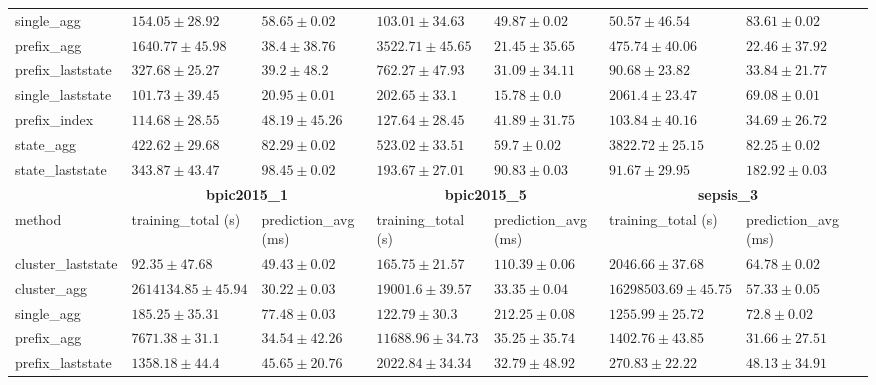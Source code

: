 \begin{table}[!htbp]
{\begin{tabular}{llllllll}
			single\_agg & $154.05 \pm 28.92$ & $58.65 \pm 0.02$ & $103.01 \pm 34.63$ & $49.87 \pm 0.02$ & $\mathbf{50.57 \pm 46.54}$ & $83.61 \pm 0.02$ \\ 
			prefix\_agg & $1640.77 \pm 45.98$ & $38.4 \pm 38.76$ & $3522.71 \pm 45.65$ & $21.45 \pm 35.65$ & $475.74 \pm 40.06$ & $\mathbf{22.46 \pm 37.92}$ \\ 
			prefix\_laststate & $327.68 \pm 25.27$ & $39.2 \pm 48.2$ & $762.27 \pm 47.93$ & $31.09 \pm 34.11$ & $90.68 \pm 23.82$ & $33.84 \pm 21.77$ \\ 
			single\_laststate & $101.73 \pm 39.45$ & $\mathbf{20.95 \pm 0.01}$ & $202.65 \pm 33.1$ & $\mathbf{15.78 \pm 0.0}$ & $2061.4 \pm 23.47$ & $69.08 \pm 0.01$ \\ 
			prefix\_index & $114.68 \pm 28.55$ & $48.19 \pm 45.26$ & $127.64 \pm 28.45$ & $41.89 \pm 31.75$ & $103.84 \pm 40.16$ & $34.69 \pm 26.72$ \\ 
			state\_agg & $422.62 \pm 29.68$ & $82.29 \pm 0.02$ & $523.02 \pm 33.51$ & $59.7 \pm 0.02$ & $3822.72 \pm 25.15$ & $82.25 \pm 0.02$ \\ 
			state\_laststate & $343.87 \pm 43.47$ & $98.45 \pm 0.02$ & $193.67 \pm 27.01$ & $90.83 \pm 0.03$ & $91.67 \pm 29.95$ & $182.92 \pm 0.03$ \\ 
			\bottomrule
			\toprule
			& \multicolumn{2}{c}{{\bfseries bpic2015\_1}} & \multicolumn{2}{c}{{\bfseries bpic2015\_5}} & \multicolumn{2}{c}{{\bfseries sepsis\_3}} \\ \cmidrule(lr){2-3} \cmidrule(lr){4-5} \cmidrule(lr){6-7}
			method  & training\_total (s) & prediction\_avg (ms) & training\_total (s) & prediction\_avg (ms) & training\_total (s) & prediction\_avg (ms) \\ \midrule
			cluster\_laststate & $92.35 \pm 47.68$ & $49.43 \pm 0.02$ & $165.75 \pm 21.57$ & $110.39 \pm 0.06$ & $2046.66 \pm 37.68$ & $64.78 \pm 0.02$ \\ 
			cluster\_agg & $2614134.85 \pm 45.94$ & $30.22 \pm 0.03$ & $19001.6 \pm 39.57$ & $33.35 \pm 0.04$ & $16298503.69 \pm 45.75$ & $57.33 \pm 0.05$ \\ 
			single\_agg & $185.25 \pm 35.31$ & $77.48 \pm 0.03$ & $122.79 \pm 30.3$ & $212.25 \pm 0.08$ & $1255.99 \pm 25.72$ & $72.8 \pm 0.02$ \\ 
			prefix\_agg & $7671.38 \pm 31.1$ & $34.54 \pm 42.26$ & $11688.96 \pm 34.73$ & $35.25 \pm 35.74$ & $1402.76 \pm 43.85$ & $\mathbf{31.66 \pm 27.51}$ \\ 
			prefix\_laststate & $1358.18 \pm 44.4$ & $45.65 \pm 20.76$ & $2022.84 \pm 34.34$ & $32.79 \pm 48.92$ & $270.83 \pm 22.22$ & $48.13 \pm 34.91$ \\ 

\end{tabular}}
\end{table}
